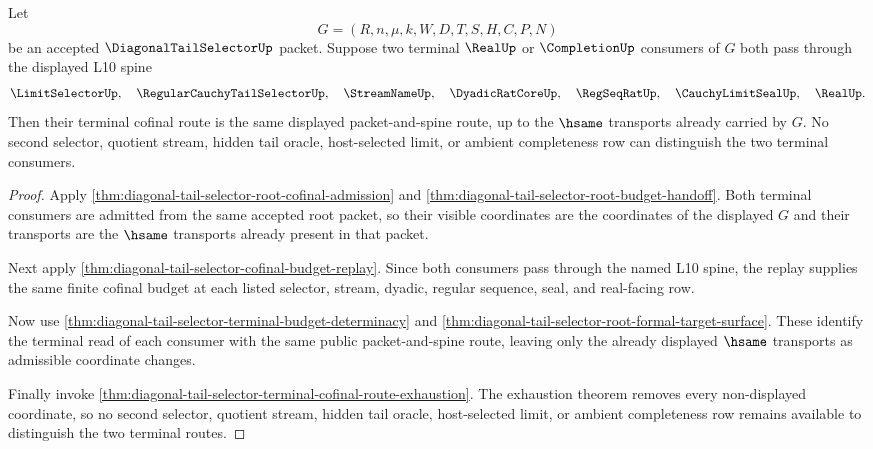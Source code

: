 \begin{theorem}
\label{thm:diagonal-tail-selector-terminal-cofinal-route-uniqueness}
Let
$$
G=(R,n,\mu,k,W,D,T,S,H,C,P,N)
$$
be an accepted $\DiagonalTailSelectorUp$ packet. Suppose two terminal
$\RealUp$ or $\CompletionUp$ consumers of $G$ both pass through the displayed
L10 spine
$$
\LimitSelectorUp,\quad
\RegularCauchyTailSelectorUp,\quad
\StreamNameUp,\quad
\DyadicRatCoreUp,\quad
\RegSeqRatUp,\quad
\CauchyLimitSealUp,\quad
\RealUp.
$$
Then their terminal cofinal route is the same displayed packet-and-spine route,
up to the $\hsame$ transports already carried by $G$. No second selector,
quotient stream, hidden tail oracle, host-selected limit, or ambient
completeness row can distinguish the two terminal consumers.
\end{theorem}
\begin{proof}
Apply \autoref{thm:diagonal-tail-selector-root-cofinal-admission} and
\autoref{thm:diagonal-tail-selector-root-budget-handoff}. Both terminal
consumers are admitted from the same accepted root packet, so their visible
coordinates are the coordinates of the displayed $G$ and their transports are
the $\hsame$ transports already present in that packet.

Next apply \autoref{thm:diagonal-tail-selector-cofinal-budget-replay}. Since
both consumers pass through the named L10 spine, the replay supplies the same
finite cofinal budget at each listed selector, stream, dyadic, regular sequence,
seal, and real-facing row.

Now use \autoref{thm:diagonal-tail-selector-terminal-budget-determinacy} and
\autoref{thm:diagonal-tail-selector-root-formal-target-surface}. These identify
the terminal read of each consumer with the same public packet-and-spine route,
leaving only the already displayed $\hsame$ transports as admissible
coordinate changes.

Finally invoke
\autoref{thm:diagonal-tail-selector-terminal-cofinal-route-exhaustion}. The
exhaustion theorem removes every non-displayed coordinate, so no second
selector, quotient stream, hidden tail oracle, host-selected limit, or ambient
completeness row remains available to distinguish the two terminal routes.
\end{proof}
